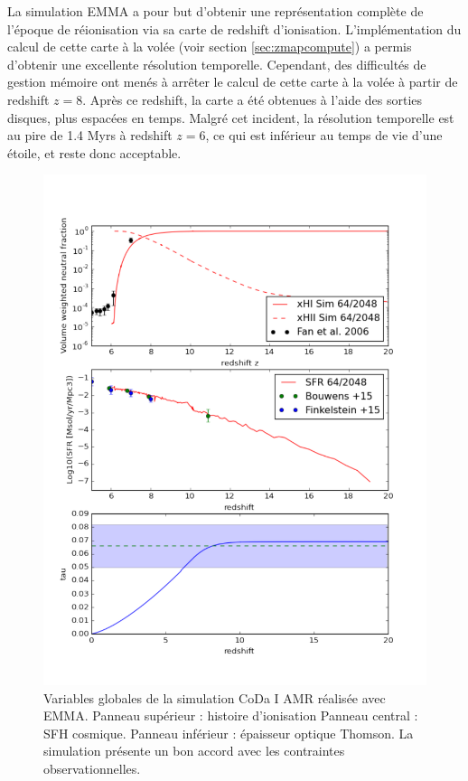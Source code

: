 La simulation EMMA a pour but d'obtenir une représentation complète de l'époque de réionisation via sa carte de redshift d'ionisation.
L'implémentation du calcul de cette carte à la volée (voir section \ref{sec:zmapcompute}) a permis d'obtenir une excellente résolution temporelle.
Cependant, des difficultés de gestion mémoire ont menés à arrêter le calcul de cette carte à la volée à partir de redshift $z=8$.
Après ce redshift, la carte a été obtenues à l'aide des sorties disques, plus espacées en temps.
Malgré cet incident, la résolution temporelle est au pire de 1.4 Myrs à redshift $z=6$, ce qui est inférieur au temps de vie d'une étoile, et reste donc acceptable.


\begin{figure}
        \includegraphics[width=.95\linewidth]{img/05/x_sfr_tau.pdf} 
        \caption[Contraintes CoDa I AMR]{ Variables globales de la simulation \ac{CoDa} I \ac{AMR} réalisée avec EMMA.
        Panneau supérieur : histoire d'ionisation
		Panneau central : SFH cosmique.
        Panneau inférieur : épaisseur optique Thomson.
        La simulation présente un bon accord avec les contraintes observationnelles.
		\label{fig:presCODAEMMA}}
\end{figure}


